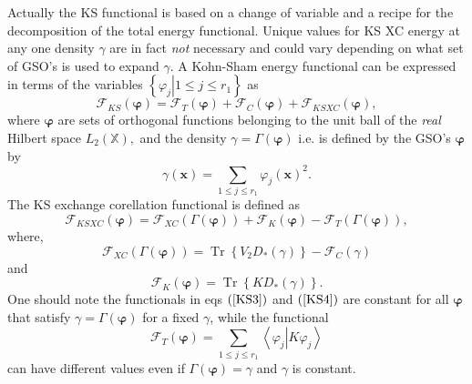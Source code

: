 \documentclass[aps,preprint]{revtex4}%
\begin{document}
Actually the KS functional is based on a change of variable and a recipe for
the decomposition of the total energy functional. Unique values for KS XC
energy at any one density $\gamma$ are in fact \emph{not} necessary and could
vary depending on what set of GSO's is used to expand $\gamma$. A Kohn-Sham
energy functional can be expressed in terms of the variables $\left\{  \left.
\varphi_{j}\right\vert 1\leq j\leq r_{1}\right\}  $ as
\begin{equation}
\mathcal{F}_{KS}\left(  \mathbf{\varphi}\right)  =\mathcal{F}_{T}\left(
\mathbf{\varphi}\right)  +\mathcal{F}_{C}\left(  \mathbf{\varphi}\right)
+\mathcal{F}_{KSXC}\left(  \mathbf{\varphi}\right)  , \label{KS1}%
\end{equation}
where $\mathbf{\varphi}$ are sets of orthogonal functions belonging to the
unit ball of the \emph{real} Hilbert space $L_{2}\left(  \mathbb{X}\right)  ,$
and the density $\gamma=\Gamma\left(  \mathbf{\varphi}\right)  $ i.e. is
defined by the GSO's $\mathbf{\varphi}$ by
\begin{equation}
\gamma\left(  \mathbf{x}\right)  =\sum_{1\leq j\leq r_{1}}\varphi_{j}\left(
\mathbf{x}\right)  ^{2}. \label{DC}%
\end{equation}
The KS exchange corellation functional is defined as
\begin{equation}
\mathcal{F}_{KSXC}\left(  \mathbf{\varphi}\right)  =\mathcal{F}_{XC}\left(
\Gamma\left(  \mathbf{\varphi}\right)  \right)  +\mathcal{F}_{K}\left(
\mathbf{\varphi}\right)  -\mathcal{F}_{T}\left(  \Gamma\left(  \mathbf{\varphi
}\right)  \right)  , \label{KS2}%
\end{equation}
where,
\begin{equation}
\mathcal{F}_{XC}\left(  \Gamma\left(  \mathbf{\varphi}\right)  \right)
=\operatorname{Tr}\left\{  V_{2}D_{\ast}\left(  \gamma\right)  \right\}
-\mathcal{F}_{C}\left(  \gamma\right)  \label{KS3}%
\end{equation}
and
\begin{equation}
\mathcal{F}_{K}\left(  \mathbf{\varphi}\right)  =\operatorname{Tr}\left\{
KD_{\ast}\left(  \gamma\right)  \right\}  . \label{KS4}%
\end{equation}
One should note the functionals in eqs $\left(  \ref{KS3}\right)  $ and
$\left(  \ref{KS4}\right)  $ are constant for all $\mathbf{\varphi}$ that
satisfy $\gamma=\Gamma\left(  \mathbf{\varphi}\right)  $ for a fixed $\gamma$,
while the functional
\begin{equation}
\mathcal{F}_{T}\left(  \mathbf{\varphi}\right)  =\sum_{1\leq j\leq r_{1}%
}\left\langle \varphi_{j}\left\vert K\varphi_{j}\right.  \right\rangle
\end{equation}
can have different values even if $\Gamma\left(  \mathbf{\varphi}\right)
=\gamma$ and $\gamma$ is constant.
\end{document}
